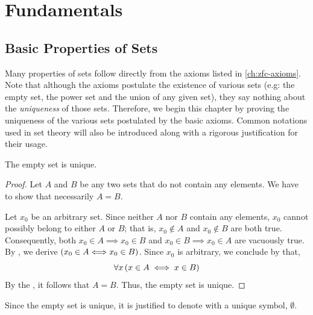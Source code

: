 \chapter{Fundamentals}
\section{Basic Properties of Sets} \label{sec:basic-properties-of-sets}

Many properties of sets follow directly from the axioms listed in \cref{ch:zfc-axioms}. Note that
although the axioms postulate the existence of various sets (e.g: the empty set, the power set and
the union of any given set), they say nothing about the \emph{uniqueness} of those sets.
Therefore, we begin this chapter by proving the uniqueness of the various sets postulated by the basic axioms.
Common notations used in set theory will also be introduced along with a rigorous justification for their usage.

\begin{thm}
    \label{thm:uniqueness-empty-set}
    The empty set is unique.
\end{thm}

\begin{proof}
    Let \( A \) and \( B \) be any two sets that do not contain any elements.
    We have to show that necessarily \( A = B \).

    \vspace{0.3cm}
    \noindent
    Let \( x_{0} \) be an arbitrary set.
    Since neither \( A \) nor \( B \) contain any elements, \( x_{0} \) cannot possibly belong to either \( A \) or \( B \);
    that is, \( x_{0} \notin A \) and \( x_{0} \notin B \) are both true.
    Consequently, both \( x_{0} \in A {\implies} x_{0} \in B \) and \( x_{0} \in B {\implies} x_{0} \in A \) are vacuously true.
    By , we derive \( \mleft( x_{0} \in A {\iff} x_{0} \in B \mright) \).
    Since \( x_{0} \) is arbitrary, we conclude by  that,
    \begin{equation*}
        \forall x \, \mleft( x \in A \iff x \in B \mright)
    \end{equation*}
    By the , it follows that \( A = B \). Thus, the empty set is unique.
\end{proof}

\begin{notation}
    \label{notation:empty-set}
    Since the empty set is unique, it is justified to denote with a unique symbol, \( \emptyset \).
\end{notation}

